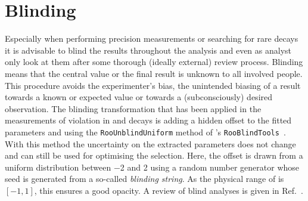 
\section{Blinding}
\label{sec:dataanalysis:blinding}

Especially when performing precision measurements or searching for rare decays
it is advisable to blind the results throughout the analysis and even as
analyst only look at them after some thorough (ideally external) review
process. Blinding means that the central value or the final result is unknown
to all involved people. This procedure avoids the experimenter's bias, \ie the
unintended biasing of a result towards a known or expected value or towards a
(subconsciously) desired observation. The blinding transformation that has
been applied in the measurements of \CP violation in \BdToJPsiKS and \BdToDD
decays is adding a hidden offset to the fitted \CP parameters \Sf and \Cf
using the \verb|RooUnblindUniform| method of \roofit's
\verb|RooBlindTools|~\cite{roofit}. With this method the uncertainty on the
extracted parameters does not change and can still be used for optimising the
selection. Here, the offset is drawn from a uniform distribution between
\num{-2} and \num{+2} using a random number generator whose seed is generated
from a so-called \emph{blinding string}. As the physical range of
\sintwobeta is $[-1,1]$, this ensures a good opacity. A review of blind
analyses is given in Ref.~\cite{Blinding}.